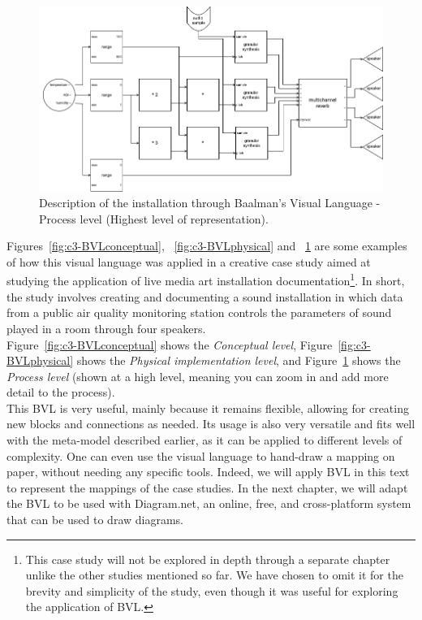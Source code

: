 \begin{figure}[!h]
    \centering
    \includegraphics[width=0.7\linewidth]{chapters/3-mdc_model-reactivation_workflow-instruction_template/image/graph03-BVLprocess.png}
    \caption{Description of the installation through Baalman’s Visual Language - Process level (Highest level of representation).}
    \label{fig:c3-BVLprocess}
\end{figure} 
Figures~\ref{fig:c3-BVLconceptual}, ~\ref{fig:c3-BVLphysical} and ~\ref{fig:c3-BVLprocess} are some examples of how this visual language was applied in a creative case study aimed at studying the application of live media art installation documentation\footnote{This case study will not be explored in depth through a separate chapter unlike the other studies mentioned so far. We have chosen to omit it for the brevity and simplicity of the study, even though it was useful for exploring the application of BVL.}. In short, the study involves creating and documenting a sound installation in which data from a public air quality monitoring station controls the parameters of sound played in a room through four speakers.\\
Figure~\ref{fig:c3-BVLconceptual} shows the \textit{Conceptual level}, Figure~\ref{fig:c3-BVLphysical} shows the \textit{Physical implementation level}, and Figure~\ref{fig:c3-BVLprocess} shows the \textit{Process level} (shown at a high level, meaning you can zoom in and add more detail to the process).\\
This BVL is very useful, mainly because it remains flexible, allowing for creating new blocks and connections as needed. Its usage is also very versatile and fits well with the meta-model described earlier, as it can be applied to different levels of complexity. One can even use the visual language to hand-draw a mapping on paper, without needing any specific tools. Indeed, we will apply BVL in this text to represent the mappings of the case studies. In the next chapter, we will adapt the BVL to be used with Diagram.net, an online, free, and cross-platform system that can be used to draw diagrams.\\
